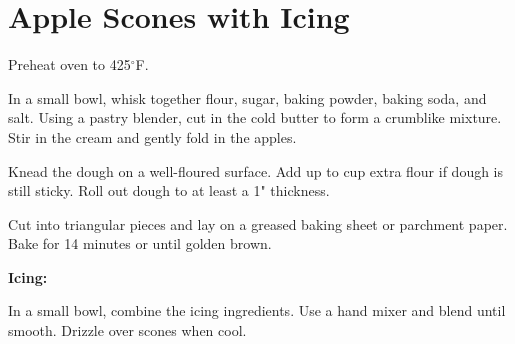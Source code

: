 \section{Apple Scones with Icing}
\begin{recipe}
	
	
	
	Preheat oven to 425$^{\circ}$F.
	
	In a small bowl, whisk together flour, sugar, baking powder, baking soda, and salt. Using a pastry blender, cut in the cold butter to form a crumblike mixture. Stir in the cream and gently fold in the apples.
	
	Knead the dough on a well-floured surface. Add up to  cup extra flour if dough is still sticky. Roll out dough to at least a 1" thickness.
	
	Cut into triangular pieces and lay on a greased baking sheet or parchment paper. Bake for 14 minutes or until golden brown. 
	
	\textbf{Icing:}
	

	In a small bowl, combine the icing ingredients. Use a hand mixer and blend until smooth. Drizzle over scones when cool.
	
\end{recipe}
